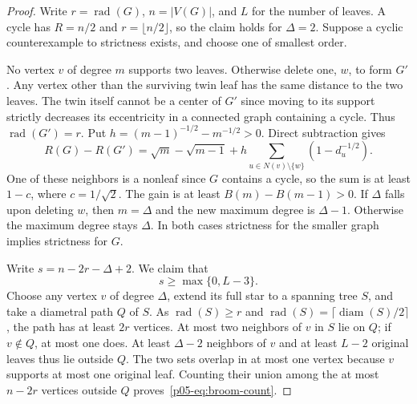 \documentclass[11pt,a4paper]{article}
\newcommand{\rad}{\operatorname{rad}}\newcommand{\diam}{\operatorname{diam}}
\begin{document}
\begin{proof}
Write $r=\rad(G)$, $n=|V(G)|$, and $L$ for the number of leaves. A cycle
has $R=n/2$ and $r=\lfloor n/2\rfloor$, so the claim holds for $\Delta=2$.
Suppose a cyclic counterexample to strictness exists, and choose one
of smallest order.

No vertex $v$ of degree $m$ supports two leaves. Otherwise delete one,
$w$, to form $G'$. Any vertex other than the surviving twin leaf has the
same distance to the two leaves. The twin itself cannot be a center of
$G'$ since moving to its support strictly decreases its eccentricity
in a connected graph containing a cycle. Thus $\rad(G')=r$.
Put $h=(m-1)^{-1/2}-m^{-1/2}>0$. Direct subtraction gives
\[
 R(G)-R(G')=\sqrt m-\sqrt{m-1}
  +h\sum_{u\in N(v)\setminus\{w\}}(1-d_u^{-1/2}).
\]
One of these neighbors is a nonleaf since $G$ contains a cycle, so
the sum is at least $1-c$, where $c=1/\sqrt2$. The gain is at least
$B(m)-B(m-1)>0$. If $\Delta$ falls upon deleting $w$, then $m=\Delta$ and the
new maximum degree is $\Delta-1$. Otherwise the maximum degree stays $\Delta$.
In both cases strictness for the smaller graph implies strictness for $G$.

Write $s=n-2r-\Delta+2$. We claim that
\begin{equation}\label{p05-eq:broom-count}
 s\ge\max\{0,L-3\}.
\end{equation}
Choose any vertex $v$ of degree $\Delta$, extend its full star to a spanning tree
$S$, and take a diametral path $Q$ of $S$. As $\rad(S)\ge r$ and
$\rad(S)=\lceil\diam(S)/2\rceil$, the path has at least $2r$ vertices.
At most two neighbors of $v$ in $S$ lie on $Q$; if $v\notin Q$, at most
one does. At least $\Delta-2$ neighbors of $v$ and at least $L-2$ original
leaves thus lie outside $Q$. The two sets overlap in at most one vertex
because $v$ supports at most one original leaf. Counting their union
among the at most $n-2r$ vertices outside $Q$ proves~\eqref{p05-eq:broom-count}.


\end{proof}
\end{document}
